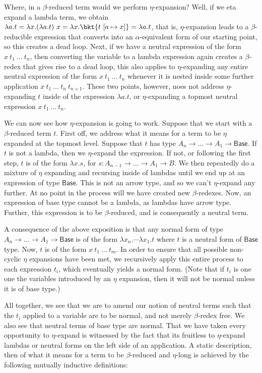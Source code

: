 Where, in a $\beta$-reduced term would we perform $\eta$-expansion? Well, if
we eta expand a lambda term, we obtain $\lambda a. t = \lambda x. (\lambda a .
t)~x = \lambda x. \bkt{t~[a \mapsto x]} = \lambda a. t$, that is,
$\eta$-expansion leads to a $\beta$-reducible expression that converts into
an $\alpha$-equivalent form of our starting point, so this creates a dead loop.
Next, if we have a neutral expression of the form $x~t_1~\ldots~t_n$, then
converting the variable to a lambda expression again creates a $\beta$-redex
that gives rise to a dead loop, this also applies to $\eta$-expanding any
entire neutral expression of the form $x~t_1~\ldots~t_n$ whenever it is
nested inside some further application $x~t_1~\ldots~t_n~t_{n+1}$. These two
points, however, noes not address $\eta$-expanding $t$ inside of the expression
$\lambda a. t$, or $\eta$-expanding a topmost neutral expression
$x~t_1~\ldots~t_n$.

We can now see how $\eta$-expansion is going to work. Suppose that we start with
a $\beta$-reduced term $t$. First off, we address what it means for a term to be
$\eta$ expanded at the topmost level. Suppose that $t$ has type $A_n \to \ldots
\to A_1 \to \mathsf{Base}$. If $t$ is not a lambda, then we $\eta$-expand the
expression. If not, or following the first step, $t$ is of the form $\lambda x.
s$, for $s : A_{n-1} \to \ldots \to A_1 \to B$. We then repeatedly do a mixture
of $\eta$ expanding and recursing inside of lambdas until we end up at an
expression of type $\mathsf{Base}$. This is not an arrow type, and so we can't
$\eta$-expand any further. At no point in the process will we have created new
$\beta$-redexes. Now, an expression of base type cannot be a lambda, as lambdas
have arrow type. Further, this expression is to be $\beta$-reduced, and is
consequently a neutral term.

A consequence of the above exposition is that any normal form of type $A_n \to
\ldots \to A_1 \to \mathsf{Base}$ is of the form $\lambda x_n. \cdots \lambda
x_1. t$ where $t$ is a neutral form of $\mathsf{Base}$ type. Now, $t$ is of the
form $x~t_1~\ldots~t_m$. In order to ensure that all possible non-cyclic $\eta$
expansions have been met, we recursively apply this entire process to each
expression $t_i$, which eventually yields a normal form. (Note that if $t_i$
is one one the variables introduced by an $\eta$ expansion, then it will not
be normal unless it is of base type.)

All together, we see that we are to amend our notion of neutral terms such that
the $t_i$ applied to a variable are to be normal, and not merely $\beta$-redex
free. We also see that neutral terms of base type are normal. That we have taken
every opportunity to $\eta$-expand is witnessed by the fact that its fruitless
to $\eta$-expand lambdas or neutral forms on the left side of an application. A
static description, then of what it means for a term to be $\beta$-reduced and
$\eta$-long is achieved by the following mutually inductive definitions:

